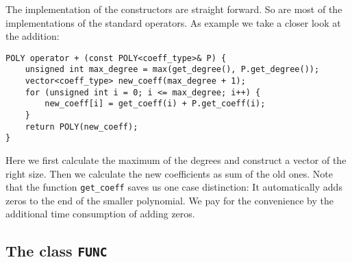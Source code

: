 \documentclass{article}
\newcommand{\code}[1]{\texttt{#1}}
\newcommand{\func}[1]{\texttt{#1}}
\begin{document}
The implementation of the constructors are straight forward. So are most of the implementations of the standard operators. As example we take a closer look at the addition:
\begin{lstlisting}
POLY operator + (const POLY<coeff_type>& P) {
	unsigned int max_degree = max(get_degree(), P.get_degree());
	vector<coeff_type> new_coeff(max_degree + 1);
	for (unsigned int i = 0; i <= max_degree; i++) {
		new_coeff[i] = get_coeff(i) + P.get_coeff(i);
	}
	return POLY(new_coeff);
}
\end{lstlisting}
Here we first calculate the maximum of the degrees and construct a vector of the right size. Then we calculate the new coefficients as sum of the old ones. Note that the function \code{get\_coeff} saves us one case distinction: It automatically adds zeros to the end of the smaller polynomial. We pay for the convenience by the additional time consumption of adding zeros.

\subsection{The class \func{FUNC}}
\end{document}

